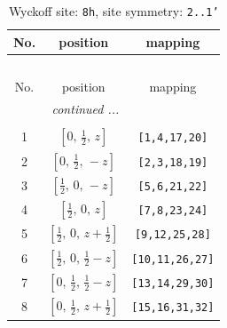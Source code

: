 \documentclass[fleqn,8pt]{jsarticle}
\begin{document}
\begin{longtable}{ccc}
\caption{Wyckoff site: {\tt 8h}, site symmetry: {\tt 2..1'}}
 \\
 \hline \hline
No. & position & mapping \\ \hline \endfirsthead

\multicolumn{2}{l}{\tablename\ \thetable{}} \\
 \hline \hline
No. & position & mapping \\ \hline \endhead

 \hline \hline
\multicolumn{2}{r}{\footnotesize\it continued ...} \\ \endfoot

 \hline \hline
\multicolumn{2}{r}{} \\ \endlastfoot

1 & $\left[ 0,\, \frac{1}{2},\, z \right]$ & {\tt [1,4,17,20]} \\ \hline
2 & $\left[ 0,\, \frac{1}{2},\, - z \right]$ & {\tt [2,3,18,19]} \\ \hline
3 & $\left[ \frac{1}{2},\, 0,\, - z \right]$ & {\tt [5,6,21,22]} \\ \hline
4 & $\left[ \frac{1}{2},\, 0,\, z \right]$ & {\tt [7,8,23,24]} \\ \hline
5 & $\left[ \frac{1}{2},\, 0,\, z + \frac{1}{2} \right]$ & {\tt [9,12,25,28]} \\ \hline
6 & $\left[ \frac{1}{2},\, 0,\, \frac{1}{2} - z \right]$ & {\tt [10,11,26,27]} \\ \hline
7 & $\left[ 0,\, \frac{1}{2},\, \frac{1}{2} - z \right]$ & {\tt [13,14,29,30]} \\ \hline
8 & $\left[ 0,\, \frac{1}{2},\, z + \frac{1}{2} \right]$ & {\tt [15,16,31,32]} \\
\end{longtable}
\renewcommand{\arraystretch}{1.2}
\end{document}
